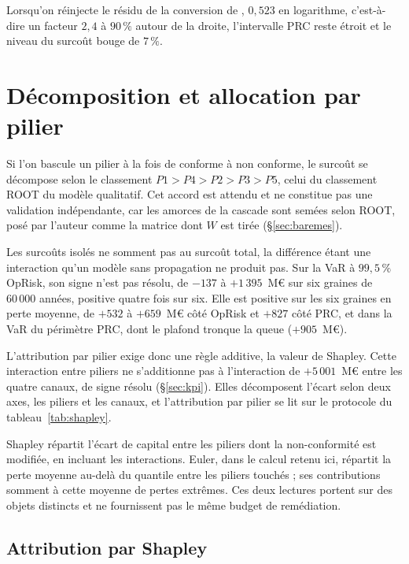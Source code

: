 Lorsqu'on
réinjecte le résidu de la conversion de \citet{jacobs2014}, $0{,}523$ en logarithme, c'est-à-dire un
facteur $2{,}4$ à $90\,\%$ autour de la droite, l'intervalle PRC reste étroit et le niveau du
surcoût bouge de $7\,\%$.


\section{Décomposition et allocation par pilier}
\label{sec:allocation}

Si l'on bascule un pilier à la fois de conforme à non conforme, le surcoût se décompose selon le
classement $P1>P4>P2>P3>P5$, celui du classement ROOT du modèle qualitatif. Cet accord est attendu et
ne constitue pas une validation indépendante, car les amorces de la cascade sont semées selon ROOT, posé par l'auteur comme
la matrice dont $W$ est tirée (\S\ref{sec:baremes}).

Les surcoûts isolés ne somment pas au surcoût total, la différence étant une interaction qu'un modèle sans
propagation ne produit pas. Sur la VaR à $99{,}5\,\%$ OpRisk, son signe n'est pas résolu, de $-137$ à
$+1\,395$~M\euro{} sur six graines de $60\,000$ années, positive quatre fois sur six. Elle est
positive sur les six graines en perte moyenne, de $+532$ à $+659$~M\euro{} côté OpRisk et $+827$
côté PRC, et dans la VaR du périmètre PRC, dont le plafond tronque la queue ($+905$~M\euro).

L'attribution par pilier exige donc une règle additive, la valeur de Shapley. Cette
interaction entre piliers ne s'additionne pas à l'interaction de $+5\,001$~M\euro{} entre les quatre
canaux, de signe résolu (\S\ref{sec:kpi}). Elles décomposent l'écart selon deux axes, les piliers et
les canaux, et l'attribution par pilier se lit sur le protocole du tableau~\ref{tab:shapley}.

Shapley répartit l'écart de capital entre les piliers
dont la non-conformité est modifiée, en incluant les interactions. Euler, dans le calcul retenu ici,
répartit la perte moyenne au-delà du quantile entre les piliers touchés ; ses contributions somment
à cette moyenne de pertes extrêmes. Ces deux lectures portent sur des objets distincts et
ne fournissent pas le même budget de remédiation.

\subsection{Attribution par Shapley}

